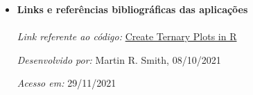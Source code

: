 \begin{itemize}

    
  	\item \textbf{Links e referências bibliográficas das aplicações}
  	  \\ \\
  	  \textit{Link referente ao código:} 
  	  \href{https://cran.r-project.org/web/packages/Ternary/vignettes/Ternary.html}{Create Ternary Plots in R}
  	
  	  \textit{Desenvolvido por:} Martin R. Smith, 08/10/2021
  	
  	  \textit{Acesso em:} 29/11/2021
  	
  \end{itemize}
